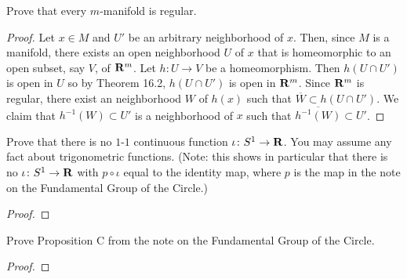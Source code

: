 \newpage
\begin{problem}[(B)]
Prove that every $m$-manifold is regular.
\end{problem}
\begin{proof}
Let $x\in M$ and $U'$ be an arbitrary
neighborhood of $x$. Then, since $M$ is a manifold, there exists an open
neighborhood $U$ of $x$ that is homeomorphic to an open subset, say $V$, of
$\mathbf{R}^m$. Let $h\colon U\to V$ be a homeomorphism. Then $h(U\cap U')$ is
open in $U$ so by Theorem 16.2, $h(U\cap U')$ is open in
$\mathbf{R}^m$. Since $\mathbf{R}^m$ is regular, there exist an neighborhood
$W$ of $h(x)$ such that $\overline W\subset h(U\cap U')$. We
claim that $h^{-1}(W)\subset U'$ is a neighborhood of $x$ such
that $\overline{h^{-1}(W)}\subset U'$.
\end{proof}
\newpage
\begin{problem}[(C)]
Prove that there is no $1$-$1$ continuous function $\iota\colon
S^1\to\mathbf{R}$. You may assume any fact about trigonometric
functions. (Note: this shows in particular that there is no
$\iota\colon S^1\to\mathbf{R}$ with $p\circ\iota$ equal to the identity
map, where $p$ is the map in the note on the Fundamental Group of
the Circle.)
\end{problem}
\begin{proof}
\end{proof}
\newpage
\begin{problem}[(D)]
Prove Proposition C from the note on the Fundamental Group of the Circle.
\end{problem}
\begin{proof}
\end{proof}

